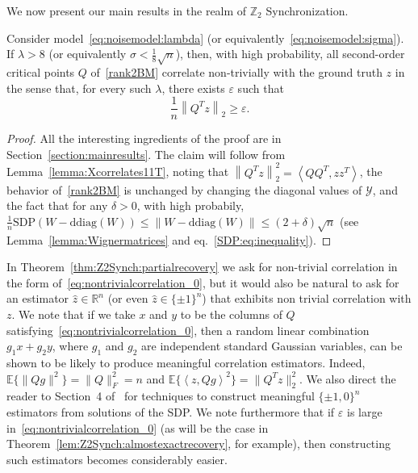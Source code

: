 \documentclass{colt2016} %
\newcommand{\inner}[2]{\left\langle{#1},{#2}\right\rangle}
\newcommand{\1}{\mathbf{1}}
\newcommand{\ZZ}{\mathbb{Z}}
\newcommand{\RR}{\mathbb{R}}
\newcommand{\EE}{\mathbb{E}}
\newcommand{\YYY}{\mathcal{Y}}
\newcommand{\eps}{\varepsilon}
\newcommand{\TODO}[1]{{\color{red}{[#1]}}}
\newcommand{\ddiag}{\mathrm{ddiag}}
\begin{document}

We now present our main results in the realm of $\ZZ_2$ Synchronization.

\begin{theorem}\label{thm:Z2Synch:partialrecovery}
Consider model~\eqref{eq:noisemodel:lambda} (or equivalently~\eqref{eq:noisemodel:sigma}). If $\lambda > 8$ (or equivalently $\sigma < \frac18\sqrt{n}$), then, with high probability, all second-order critical points $Q$ of~\eqref{rank2BM} correlate non-trivially with the ground truth $z$ in the sense that, for every such $\lambda$, there exists $\eps$ such that
\begin{equation}\label{eq:nontrivialcorrelation_0}
\frac1{n} \left\| Q^Tz\right\|_2 \geq \eps.
\end{equation}
\end{theorem}
\begin{proof}
All the interesting ingredients of the proof are in Section~\ref{section:mainresults}. The claim will follow from Lemma~\ref{lemma:Xcorrelates11T}, noting that $\left\| Q^Tz\right\|_2^2 = \left\langle QQ^T,zz^T \right\rangle$, the behavior of~\eqref{rank2BM} is unchanged by changing the diagonal values of $\YYY$, and the fact that for any $\delta>0$, with high probabily, $\frac1n\mathrm{SDP}(W-\ddiag(W))\leq \|W-\ddiag(W)\| \leq (2+\delta)\sqrt{n}$ (see Lemma~\ref{lemma:Wignermatrices} and eq.~\eqref{SDP:eq:inequality}).
\end{proof}

\begin{remark}[Rounding]
In Theorem~\eqref{thm:Z2Synch:partialrecovery} we ask for non-trivial correlation in the form of~\eqref{eq:nontrivialcorrelation_0}, but it would also be natural to ask for an estimator $\hat{z}\in\RR^n$ (or even $\hat{z}\in\{\pm1\}^n$) that exhibits non trivial correlation with $z$. We note that if we take $x$ and $y$ to be the columns of $Q$ satisfying~\eqref{eq:nontrivialcorrelation_0}, then a random linear combination $g_1x+g_2y$, where $g_1$ and $g_2$ are independent standard Gaussian variables, can be shown to be likely to produce meaningful correlation estimators. Indeed, $\EE\{ \|Qg\|^2 \} = \|Q\|_F^2 = n$ and $\EE\{  \inner{z}{Qg}^2 \} = \|Q^Tz\|_2^2$. We also direct the reader to Section~4 of~\citep{Montanari_SDPdetectionSBM} for techniques to construct meaningful $\{\pm1,0\}^n$ estimators from solutions of the SDP. We note furthermore that if $\eps$ is large in~\eqref{eq:nontrivialcorrelation_0} (as will be the case in Theorem~\ref{lem:Z2Synch:almostexactrecovery}, for example), then constructing such estimators becomes considerably easier.
\end{remark}
\end{document}
